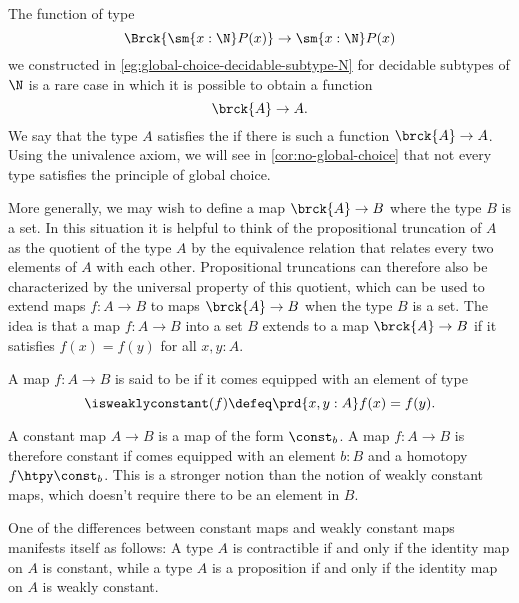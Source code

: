 \begin{rmk}\label{rmk:global-choice}
  The function of type
  \begin{equation*}
    \Brck{\sm{x:\N}P(x)}\to\sm{x:\N}P(x)
  \end{equation*}
  we constructed in \cref{eg:global-choice-decidable-subtype-N} for decidable subtypes of $\N$ is a rare case in which it is possible to obtain a function
  \begin{equation*}
    \brck{A}\to A.
  \end{equation*}
  We say that the type $A$ satisfies the  if there is such a function $\brck{A}\to A$. Using the univalence axiom, we will see in \cref{cor:no-global-choice} that not every type satisfies the principle of global choice. 
\end{rmk}

More generally, we may wish to define a map $\brck{A}\to B$ where the type $B$ is a set. In this situation it is helpful to think of the propositional truncation of $A$ as the quotient of the type $A$ by the equivalence relation that relates every two elements of $A$ with each other. Propositional truncations can therefore also be characterized by the universal property of this quotient, which can be used to extend maps $f:A\to B$ to maps $\brck{A}\to B$ when the type $B$ is a set. The idea is that a map $f:A\to B$ into a set $B$ extends to a map $\brck{A}\to B$ if it satisfies $f(x)=f(y)$ for all $x,y:A$.

\begin{defn}\label{defn:weakly-constant}
  A map $f:A\to B$ is said to be  if it comes equipped with an element of type
  \begin{equation*}
    \isweaklyconstant(f) \defeq \prd{x,y:A}f(x)=f(y).
  \end{equation*}
\end{defn}

\begin{rmk}
  A constant map $A\to B$ is a map of the form $\const_b$. A map $f:A\to B$ is therefore constant if comes equipped with an element $b:B$ and a homotopy $f\htpy \const_b$. This is a stronger notion than the notion of weakly constant maps, which doesn't require there to be an element in $B$.

  One of the differences between constant maps and weakly constant maps manifests itself as follows: A type $A$ is contractible if and only if the identity map on $A$ is constant, while a type $A$ is a proposition if and only if the identity map on $A$ is weakly constant.
\end{rmk}


